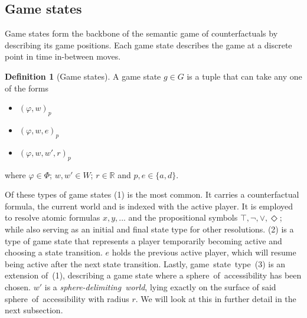 \documentclass[a4paper,american,10pt]{paper}
\theoremstyle{definition}\newtheorem{definition}{Definition}
\begin{document}
\subsection{Game states}
Game states form the backbone of the semantic game of counterfactuals by describing its game positions. Each game state describes the game at a discrete point in time in-between moves.
\begin{definition}[Game states]
A game state $g\in G$ is a tuple that can take any one of the forms
\begin{itemize}
	\item[(1)] $(\varphi ,w)_p$
	\item[(2)] $(\varphi ,w, e)_p$
	\item[(3)] $(\varphi ,w,w',r)_p$
\end{itemize}
where $\varphi\in\Phi$; $w,w'\in W$; $r\in\mathbb{R}$ and $p,e\in\{ a,d\}$.
\end{definition}
\noindent Of these types of game states (1) is the most common. It carries a counterfactual formula, the current world and is indexed with the active player. It is employed to resolve atomic formulas $x,y,...$ and the propositional symbols $\top,\neg,\vee,\Diamond$; while also serving as an initial and final state type for other resolutions. (2) is a type of game state that represents a player temporarily becoming active and choosing a state transition. $e$ holds the previous active player, which will resume being active after the next state transition. Lastly, game~state~type~(3) is an extension of~(1), describing a game state where a sphere~of~accessibility has been chosen. $w'$ is a \textit{sphere-delimiting~world}, lying exactly on the surface of said sphere~of~accessibility with radius $r$. We will look at this in further detail in the next subsection.\\
\end{document}
